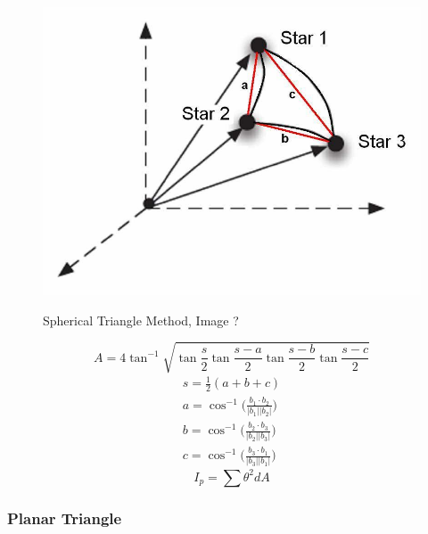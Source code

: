\documentclass[12pt,a4paper,oneside]{article}
\begin{document}
\begin{figure}[h]
\includegraphics[scale=0.29]{spherical_triangle_method.jpg}
\centering
\label{fig:body_frame}
\caption{Spherical Triangle Method, Image \cite{cole2004fast}?}
\end{figure}

\cite{cole2004fast}

\begin{equation}
A = 4\tan^{-1}\sqrt{\tan\frac{s}{2}\tan\frac{s-a}{2}\tan\frac{s-b}{2}\tan\frac{s-c}{2}}
\end{equation}
\begin{subequations}
\begin{align*}
s = \frac{1}{2}(a + b + c) \\
a = \cos^{-1} \bigg(\frac{b_1 \cdot b_2}{|b_1||b_2|}\bigg) \\
b = \cos^{-1} \bigg(\frac{b_2 \cdot b_3}{|b_2||b_3|}\bigg) \\
c = \cos^{-1} \bigg(\frac{b_3 \cdot b_1}{|b_3||b_1|}\bigg) 
\end{align*}
\end{subequations}
\begin{equation}
I_p = \sum\theta^2dA
\end{equation}
\subsubsection{Planar Triangle}
\end{document}
